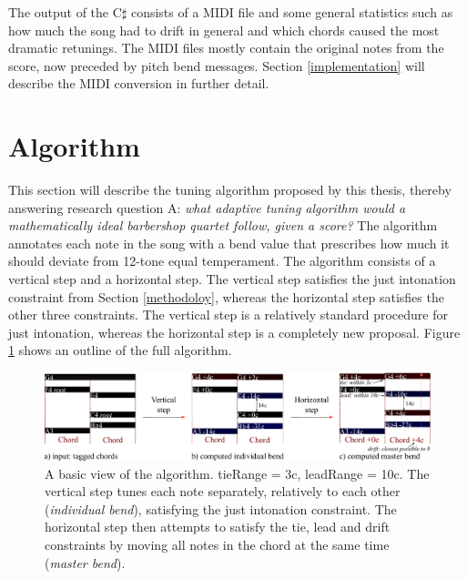 \documentclass[a4paper]{article}
\begin{document}
The output of the C$\sharp$ consists of a MIDI file \cite{midi_manufacturers_association_complete_2014} and some general statistics such as how much the song had to drift in general and which chords caused the most dramatic retunings. The MIDI files mostly contain the original notes from the score, now preceded by pitch bend messages. Section \ref{implementation} will describe the MIDI conversion in further detail.


\section{Algorithm}
\label{algorithm}
This section will describe the tuning algorithm proposed by this thesis, thereby answering research question A: {\it what adaptive tuning algorithm would a mathematically ideal barbershop quartet follow, given a score?} The algorithm annotates each note in the song with a bend value that prescribes how much it should deviate from 12-tone equal temperament. The algorithm consists of a vertical step and a horizontal step. The vertical step satisfies the just intonation constraint from Section \ref{methodoloy}, whereas the horizontal step satisfies the other three constraints. The vertical step is a relatively standard procedure for just intonation, whereas the horizontal step is a completely new proposal. Figure \ref{fig:algo_outline} shows an outline of the full algorithm.

\begin{figure}
	\includegraphics[width=\linewidth]{Figures/algo_outline.pdf}
	\caption{A basic view of the algorithm. tieRange = 3c, leadRange = 10c. The vertical step tunes each note separately, relatively to each other (\textit{individual bend}), satisfying the just intonation constraint. The horizontal step then attempts to satisfy the tie, lead and drift constraints by moving all notes in the chord at the same time (\textit{master bend}).}
	\label{fig:algo_outline}
\end{figure}
\end{document}
